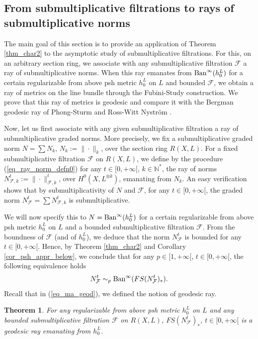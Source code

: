 \documentclass[12pt]{article}
\numberwithin{equation}{section}
\theoremstyle{theorem}
\newtheorem{thm}{Theorem}[section]
\theoremstyle{definition}
\theoremstyle{remark}
\newcommand{\nat}{\mathbb{N}}
\begin{document}
	\subsection{From submultiplicative filtrations to rays of submultiplicative norms}\label{sect_pf_filt}
	The main goal of this section is to provide an application of Theorem \ref{thm_char2} to the asymptotic study of submultiplicative filtrations.
	For this, on an arbitrary section ring, we associate with any submultiplicative filtration $\mathcal{F}$ a ray of submultiplicative norms.
	When this ray emanates from ${\rm{Ban}}^{\infty}(h^L_0)$ for a certain regularizable from above psh metric $h^L_0$ on $L$ and bounded $\mathcal{F}$, we obtain a ray of metrics on the line bundle through the Fubini-Study construction.
	We prove that this ray of metrics is geodesic and compare it with the Bergman geodesic ray of Phong-Sturm \cite{PhongSturmTestGeodK} and Ross-Witt Nystr{\"o}m \cite{RossNystAnalTConf}.
	\par 
	Now, let us first associate with any given submultiplicative filtration a ray of submultiplicative graded norms.
	More precisely, we fix a submultiplicative graded norm $N = \sum N_k$, $N_k := \| \cdot \|_k$, over the section ring $R(X, L)$.
	For a fixed submultiplicative filtration $\mathcal{F}$ on $R(X, L)$, we define by the procedure (\ref{eq_ray_norm_defn0}) for any $t \in [0, +\infty[$, $k \in \nat^*$, the ray of norms $N^t_{\mathcal{F},  k} := \| \cdot \|^t_{\mathcal{F}, k}$, over $H^0(X, L^{\otimes k})$, emanating from $N_k$.
	An easy verification shows that by submultiplicativity of $N$ and $\mathcal{F}$, for any $t \in [0, +\infty[$, the graded norm $N^t_{\mathcal{F}} = \sum N^t_{\mathcal{F},  k}$ is submultiplicative.
	\par
	We will now specify this to $N = {\rm{Ban}}^{\infty}(h^L_0)$ for a certain regularizable from above psh metric $h^L_0$ on $L$ and a bounded submultiplicative filtration $\mathcal{F}$.
	From the boundness of $\mathcal{F}$ (and of $h^L_0$), we deduce that the norm $N^t_{\mathcal{F}}$ is bounded for any $t \in [0, +\infty[$.
	Hence, by Theorem \ref{thm_char2} and Corollary \ref{cor_psh_appr_below}, we conclude that for any $p \in [1, +\infty[$, $t \in [0, + \infty[$, the following equivalence holds
	\begin{equation}\label{eq_n1_equiv}
		N^t_{\mathcal{F}}
		\sim_p
		{\rm{Ban}}^{\infty}(FS(N^t_{\mathcal{F}})_*).
	\end{equation}
	Recall that in (\ref{eq_ma_geod}), we defined the notion of geodesic ray.
	\begin{thm}\label{thm_ray_geod_bergm}
		For any regularizable from above psh metric $h^L_0$ on $L$ and any bounded submultiplicative filtration $\mathcal{F}$ on $R(X, L)$, $FS(N^t_{\mathcal{F}})_*$, $t \in [0, +\infty[$ is a geodesic ray emanating from $h^L_0$.
	\end{thm}
\end{document}
